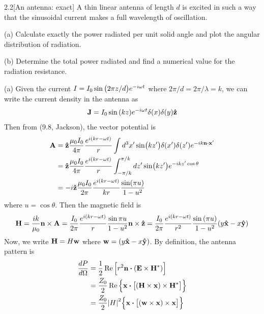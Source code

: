 \documentclass[12pt]{article}
\begin{document}
\newpage
\begin{problem}{2.2}[An antenna: exact]
A thin linear antenna of length $d$ is excited in such a way that the sinusoidal
current makes a full wavelength of oscillation.

(a) Calculate exactly the power radiated per unit solid angle and plot the
angular distribution of radiation.

(b) Determine the total power radiated and find a numerical value for the
radiation resistance.
\begin{solution}
(a) Given the current $I=I_0\sin\qty(2\pi z/d) e^{-i\omega t}$ where $2\pi
/d=2\pi/\lambda=k$, we can write the current density in the antenna as
\begin{equation}\label{p2:J}
    \vb{J}=I_0\sin\qty(kz)e^{-i\omega t}\delta(x)\delta(y)\vb{\hat{z}}
\end{equation}
Then from (9.8, Jackson), the vector potential is
\begin{align}
    \vb{A}
    &=\zhat\frac{\mu_0I_0}{4\pi}\frac{e^{i(kr-\omega t)}}{r}
        \int d^3x'\sin(kz')\delta(x')\delta(z')e^{-ik\vb{n}\vdot\vb{x}'}
        \notag\\
    &=\zhat\frac{\mu_0I_0}{4\pi}\frac{e^{i(kr-\omega t)}}{r}
    \int_{-\pi/k}^{\pi/k}dz'\sin(kz')e^{-ikz'\cos\theta}\notag\\
    &=-i\zhat\frac{\mu_0I_0}{2\pi}\frac{e^{i(kr-\omega t)}}{kr}\frac{\sin(\pi
    u)}{1-u^2}
\end{align}
where $u=\cos\theta$. Then the magnetic field is
\begin{align}
    \vb{H}
    =\frac{ik}{\mu_0}\vb{n}\times\vb{A}
    =\frac{I_0}{2\pi}\frac{e^{i(kr-\omega t)}}{r}\frac{\sin\pi
    u}{1-u^2}\vb{n}\times\vb{\hat{z}}
    =\frac{I_0}{2\pi}\frac{e^{i(kr-\omega t)}}{r^2}\frac{\sin\qty(\pi
    u)}{1-u^2}\qty(y\vb{\hat{x}}-x\vb{\hat{y}})
\end{align}
Now, we write $\vb{H}=H\vb{w}$ where $\vb{w}=(y\vb{\hat{x}}-x\vb{\hat{y}})$. By definition, 
the antenna pattern is
\begin{align}
    \frac{dP}{d\Omega}
    &=\frac12\Re\qty[r^2\vb{n}\vdot\qty(\vb{E}\times\vb{H}^\ast)]\notag\\
    &=\frac{Z_0}{2}\Re\qty{
    \vb{x}\vdot\qty[\qty(\vb{H}\times\vb{x})\times\vb{H}^\ast]}\notag\\
    &=\frac{Z_0}{2}\abs{H}^2\qty{\vb{x}\vdot\qty[(\vb{w}\times\vb{x})\times\vb{x}]}\notag\\

\end{align}
\end{solution}
\end{problem}
\end{document}
